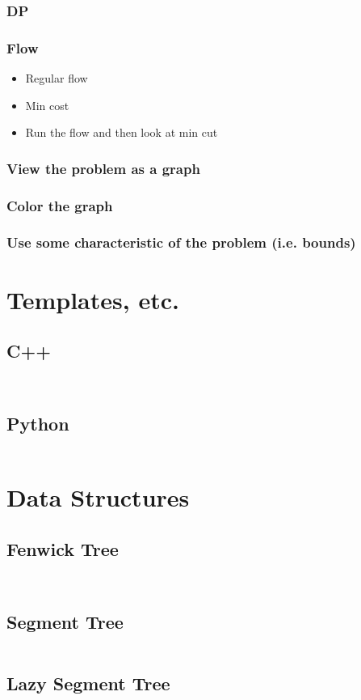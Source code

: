 \documentclass[8pt,a4paper,landscape,oneside]{amsart}
\newcommand{\codej}[1]{\inputminted[fontsize=\large,tabsize=2,baselinestretch=1]{java}{code/#1}}
\newcommand{\codec}[1]{\inputminted[fontsize=\large,tabsize=2,baselinestretch=1]{cpp}{code/#1}}
\newcommand{\codep}[1]{\inputminted[fontsize=\large,tabsize=2,baselinestretch=1]{py}{code/#1}}
\begin{document}
\begin{multicols*}{2}
\begin{large}
\subsubsection{DP}
\subsubsection{Flow}
\begin{itemize}
    \item Regular flow 
    \item Min cost
    \item Run the flow and then look at min cut 
\end{itemize}
\subsubsection{View the problem as a graph}
\subsubsection{Color the graph}
\subsubsection{Use some characteristic of the problem (i.e. bounds)}
\section{Templates, etc.}
\subsection{C++}
\codec{template.cpp}
\codec{input.cpp}
\subsection{Python}
\codep{template.py}
\section{Data Structures}
\subsection{Fenwick Tree}
\codep{fenwicktree.py}
\codej{fenwicktree.java}
\subsection{Segment Tree}
\codep{sgmtree.cpp}
\subsection{Lazy Segment Tree}
\codec{lazysgmtree.cpp}

\end{large}
\end{multicols*}
\end{document}

